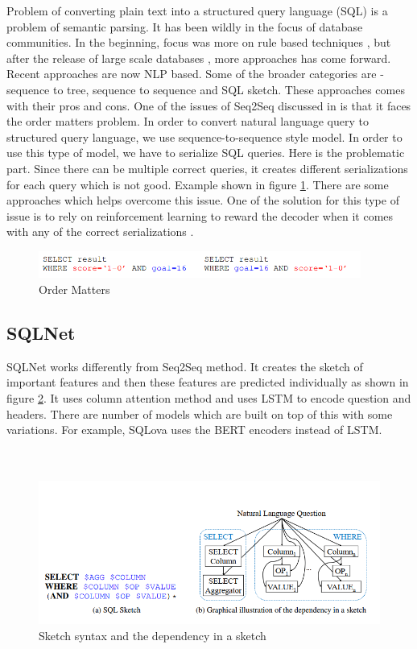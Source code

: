 \documentclass[12pt]{article}
\begin{document}
Problem of converting plain text into a structured query language (SQL) is a problem of semantic parsing. It has been wildly in the focus of database communities. In the beginning, focus was more on rule based techniques \cite{setlur2016eviza}, but after the release of large scale databases \cite{yu2018spider} \cite{zhong2017seq2sql}, more approaches has come forward. Recent approaches are now NLP based. Some of the broader categories are - sequence to tree, sequence to sequence and SQL sketch. These approaches comes with their pros and cons. One of the issues of Seq2Seq discussed in \cite{xu2017sqlnet} is that it faces the order matters problem. In order to convert natural language query to
structured query language, we use sequence-to-sequence style model. In order to use this type of model, we have to serialize SQL queries. Here is the problematic part. Since there can be multiple correct queries, it creates different serializations for each query which is not good. Example shown in figure \ref{fig:Order Matters}. There are some approaches which helps overcome this issue. One of the solution for this type of issue is to rely on reinforcement learning to reward the decoder when it comes with any of the correct serializations \cite{xu2017sqlnet}. 


\begin{figure}[H]
    \includegraphics[width=300pt]{OrderMatters}
    \caption{Order Matters}
    \label{fig:Order Matters}
\end{figure}

\subsection{SQLNet}
SQLNet \cite{xu2017sqlnet} works differently from Seq2Seq method. It creates the sketch of important features and then these features are predicted individually as shown in figure \ref{sqlsketch}. It uses column attention method and uses LSTM to encode question and headers. There are number of models which are built on top of this with some variations. For example, SQLova \cite{hwang2019comprehensive} uses the BERT encoders instead of LSTM. 
\\
\\
\\
\begin{figure}[H]
    \includegraphics[width=400pt]{sqlsketch}
    \caption{Sketch syntax and the dependency in a sketch}
    \label{sqlsketch}
\end{figure}
\end{document}
